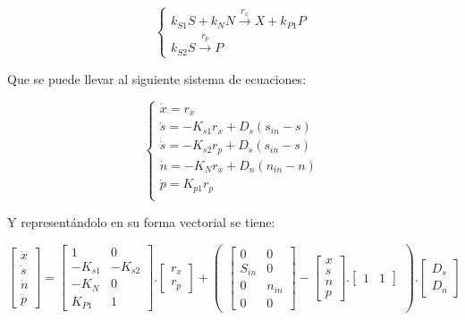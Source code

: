 \documentclass[letterpaper, 10 pt, conference]{ieeeconf}  %
\begin{document}
\begin{equation*}
	\begin{cases}
    k_{S1} S + k_N N \xrightarrow{r_x} X + k_{P1} P \\
    k_{S2} S \xrightarrow{r_p} P
	\end{cases}
\end{equation*}

Que se puede llevar al siguiente sistema de ecuaciones:

\begin{equation*}
	\begin{cases}
    \dot{x} = r_{x} \\
    \dot{s} = -K_{s1}r_{x}  + D_{s}(s_{in}  - s) \\
    \dot{s} = -K_{s2}r_{p}  + D_{s}(s_{in}  - s) \\
    \dot{n} = -K_{N}r_{x}  + D_{n}(n_{in}  - n) \\
    \dot{p} = K_{p1}r_{p} \\
	\end{cases}
\end{equation*}

Y representándolo en su forma vectorial se tiene:

\vspace{0.35cm}

$
\begin{bmatrix} \dot{x} \\ \dot{s} \\ \dot{n} \\ \dot{p} \end{bmatrix}
=
\begin{bmatrix} 1 & 0 \\ -K_{s1} & -K_{s2} \\ -K_{N} & 0 \\ K_{P1} & 1 \end{bmatrix}
.
\begin{bmatrix} r_{x} \\ r_{p} \end{bmatrix}
+
\begin{pmatrix}
  \begin{bmatrix} 0 & 0 \\ S_{in} & 0 \\ 0 & n_{in} \\ 0 & 0 \end{bmatrix}
  -
  \begin{bmatrix} x \\ s \\ n \\ p \end{bmatrix}
  .
  \begin{bmatrix} 1 & 1 \end{bmatrix}
\end{pmatrix}
.
  \begin{bmatrix} D_{s} \\ D_{n} \end{bmatrix}
$
\end{document}
